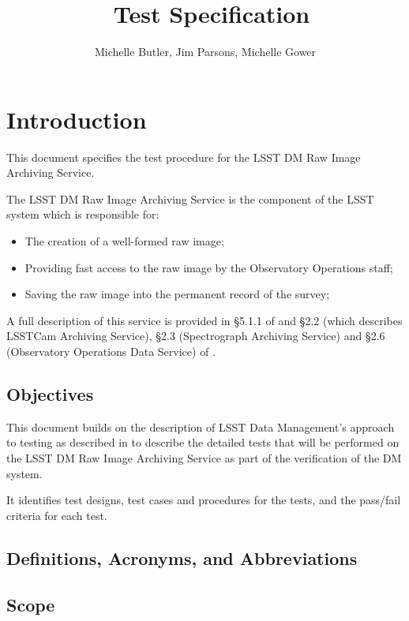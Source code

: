 \documentclass[DM,lsstdraft,STS,toc]{lsstdoc}
\author{Michelle Butler, Jim Parsons, Michelle Gower}
\title[Test Spec for \product]{\product~Test Specification}
\def\product{LSST DM Raw Image Archiving Service}
\begin{document}
\maketitle

\section{Introduction}
\label{sec:intro}


This document specifies the test procedure for the \product{}.


The \product{} is the component of the LSST system which is responsible for:
\begin{itemize}
\item{The creation of a well-formed raw image;}
\item{Providing fast access to the raw image by the Observatory Operations staff;}
\item{Saving the raw image into the permanent record of the survey;}
\end{itemize}


A full description of this service is provided in \S5.1.1 of 
and \S2.2 (which describes LSSTCam Archiving Service),
\S2.3 (Spectrograph Archiving Service) and
\S2.6 (Observatory Operations Data Service) of .




\subsection{Objectives}
\label{sec:objectives}




This document builds on the description of LSST Data Management's
approach to testing as described in  to describe
the detailed tests that will be performed on the \product{} as part
of the verification of the DM system.


It identifies test designs, test cases and procedures for the tests,
and the pass/fail criteria for each test.

\subsection{Definitions, Acronyms, and Abbreviations \label{sec:acronyms}}


\subsection{Scope}
\label{sec:scope}
\end{document}

